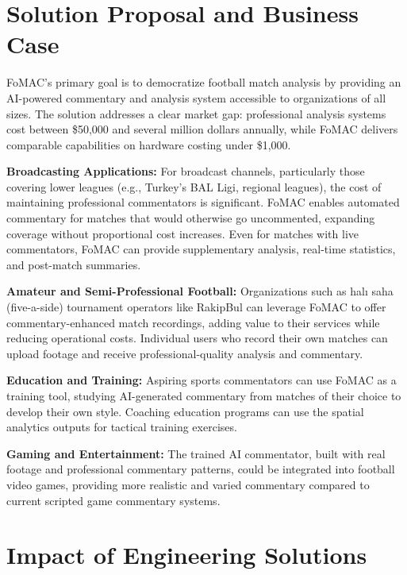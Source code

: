 \documentclass[10pt,twocolumn,a4paper]{article}
\begin{document}
\section{Solution Proposal and Business Case}

FoMAC's primary goal is to democratize football match analysis by providing an AI-powered commentary and analysis system accessible to organizations of all sizes. The solution addresses a clear market gap: professional analysis systems cost between \$50,000 and several million dollars annually, while FoMAC delivers comparable capabilities on hardware costing under \$1,000.

\textbf{Broadcasting Applications:} For broadcast channels, particularly those covering lower leagues (e.g., Turkey's BAL Ligi, regional leagues), the cost of maintaining professional commentators is significant. FoMAC enables automated commentary for matches that would otherwise go uncommented, expanding coverage without proportional cost increases. Even for matches with live commentators, FoMAC can provide supplementary analysis, real-time statistics, and post-match summaries.

\textbf{Amateur and Semi-Professional Football:} Organizations such as hal{\i} saha (five-a-side) tournament operators like RakipBul can leverage FoMAC to offer commentary-enhanced match recordings, adding value to their services while reducing operational costs. Individual users who record their own matches can upload footage and receive professional-quality analysis and commentary.

\textbf{Education and Training:} Aspiring sports commentators can use FoMAC as a training tool, studying AI-generated commentary from matches of their choice to develop their own style. Coaching education programs can use the spatial analytics outputs for tactical training exercises.

\textbf{Gaming and Entertainment:} The trained AI commentator, built with real footage and professional commentary patterns, could be integrated into football video games, providing more realistic and varied commentary compared to current scripted game commentary systems.

\section{Impact of Engineering Solutions}
\end{document}
